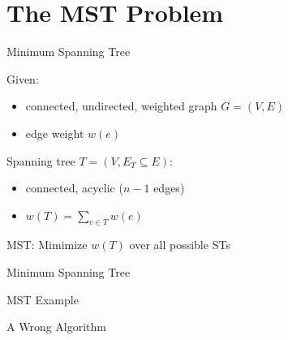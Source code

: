 \section{The MST Problem}	\label{section:mst-problem}

\begin{frame}{Minimum Spanning Tree}
  \begin{definition}[MST]
	Given:
	\begin{itemize}
	  \item connected, undirected, weighted graph $G = (V, E)$
	  \item edge weight $w(e)$
	\end{itemize}
    
	\pause
	\vspace{0.30cm}

	Spanning tree $T = (V, E_{T} \subseteq E)$:
	\begin{itemize}
	  \item connected, acyclic \pause ($n-1$ edges)
		\pause
	  \item $w(T) = \sum_{e \in T} w(e)$
	\end{itemize}

	\pause
	\vspace{0.80cm}
	\centerline{MST: Mimimize $w(T)$ over all possible STs}
  \end{definition}
\end{frame}
\begin{frame}{Minimum Spanning Tree}
  \begin{exampleblock}{MST Example}
  \end{exampleblock}
\end{frame}
\begin{frame}{A Wrong Algorithm}
\end{frame}

